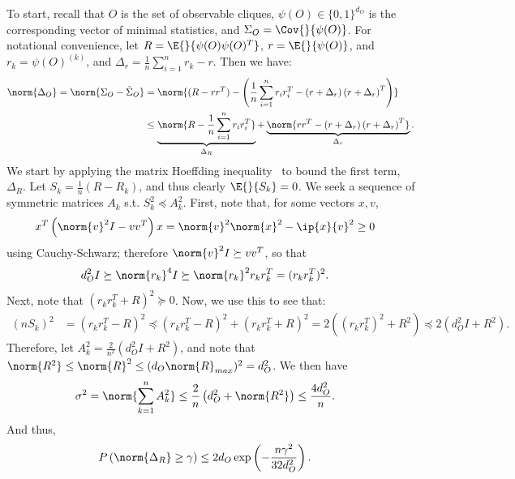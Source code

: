 \documentclass[letterpaper]{article}
\begin{document}
\begin{appendix}
To start, recall that $O$ is the set of observable cliques, $\psi(O) \in \{0,1\}^{d_O}$ is the corresponding vector of minimal statistics, and $\Sigma_O = \Cov{}{ \psi(O) }$.
For notational convenience, let $R = \E{}{ \psi(O)\psi(O)^T }$, $r = \E{}{ \psi(O) }$, and $r_k = \psi(O)^{(k)}$, and $\Delta_r = \frac1n\sum_{i=1}^n r_k - r$.
Then we have:
\begin{align*}
	\norm{ \Delta_O }
	=
	\norm{ \Sigma_O - \tilde{\Sigma}_O }
	&=
	\norm{ 
		(R - rr^T) 
		- \left( 
			\frac1n \sum_{i=1}^n r_ir_i^T 
			- \left( r + \Delta_r \right)
				\left( r + \Delta_r \right)^T
		\right)
	}\\
	&\leq
	\underbrace{ \norm{ R - \frac1n \sum_{i=1}^n r_ir_i^T } }_{\Delta_R}
	+ \underbrace{ \norm{ 
		rr^T - \left( r + \Delta_r \right) \left( r + \Delta_r \right)^T 
	} }_{\Delta_r}.
\end{align*}
We start by applying the matrix Hoeffding inequality~\citep{tropp2015introduction} to bound the first term, $\Delta_R$.
Let $S_k = \frac1n (R - R_k)$, and thus clearly $\E{}{S_k} = 0$.
We seek a sequence of symmetric matrices $A_k$ s.t. $S_k^2 \preceq A_k^2$.
First, note that, for some vectors $x,v$,
\begin{align*}
	x^T\left( \norm{ v }^2I - vv^T \right)x
	&=
	\norm{ v }^2 \norm{ x }^2 - \ip{x}{v}^2
	\geq
	0
\end{align*}
using Cauchy-Schwarz; therefore $\norm{v}^2I \succeq vv^T$, so that
\begin{align*}
	d_O^2I 
	&\succeq
	\norm{ r_k }^4I
	\succeq
	\norm{ r_k }^2 r_kr_k^T 
	=
	(r_kr_k^T)^2.
\end{align*}
Next, note that $(r_kr_k^T + R)^2 \succeq 0$.
Now, we use this to see that:
\begin{align*}
	(nS_k)^2
	&=
	(r_kr_k^T - R)^2
	\preceq
	(r_kr_k^T - R)^2 + (r_kr_k^T + R)^2
	=
	2((r_kr_k^T)^2 + R^2)
	\preceq
	2(d_O^2I + R^2).
\end{align*}
Therefore, let $A_k^2 = \frac{2}{n^2}(d_O^2I + R^2)$, and note that $\norm{R^2} \leq \norm{R}^2 \leq (d_O\norm{R}_{max})^2 = d_O^2$.
We then have
\begin{align*}
	\sigma^2
	&=
	\norm{ \sum_{k=1}^n A_k^2 }
	\leq
	\frac{2}{n}\left( d_O^2 + \norm{R^2} \right)
	\leq
	\frac{4d_O^2}{n}.
\end{align*}
And thus,
\begin{align}
	P\left( \norm{ \Delta_R } \geq \gamma \right)
	&\leq
	2d_O\exp\left(
		-\frac{
			n\gamma^2
		}{
			32d_O^2
		}
	\right).
	\label{eqn:matrix_hoeffding}
\end{align}


\end{appendix}
\end{document}
